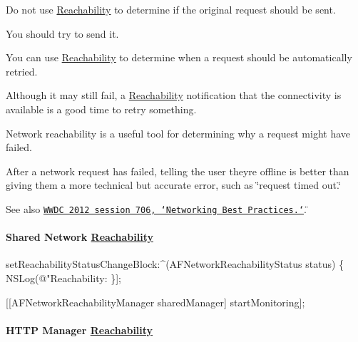 \begin{DoxyItemize}
\item Do not use \mbox{\hyperlink{interface_reachability}{Reachability}} to determine if the original request should be sent.
\begin{DoxyItemize}
\item You should try to send it.
\end{DoxyItemize}
\item You can use \mbox{\hyperlink{interface_reachability}{Reachability}} to determine when a request should be automatically retried.
\begin{DoxyItemize}
\item Although it may still fail, a \mbox{\hyperlink{interface_reachability}{Reachability}} notification that the connectivity is available is a good time to retry something.
\end{DoxyItemize}
\item Network reachability is a useful tool for determining why a request might have failed.
\begin{DoxyItemize}
\item After a network request has failed, telling the user they\textquotesingle{}re offline is better than giving them a more technical but accurate error, such as \char`\"{}request timed out.\char`\"{}
\end{DoxyItemize}
\end{DoxyItemize}

See also \href{https://developer.apple.com/videos/play/wwdc2012-706/}{\tt W\+W\+DC 2012 session 706, \char`\"{}\+Networking Best Practices.\char`\"{}}.

\paragraph*{Shared Network \mbox{\hyperlink{interface_reachability}{Reachability}}}


\begin{DoxyCode}
[[AFNetworkReachabilityManager sharedManager]
       setReachabilityStatusChangeBlock:^(AFNetworkReachabilityStatus status) \{
    NSLog(@"Reachability: %
\}];

[[AFNetworkReachabilityManager sharedManager] startMonitoring];
\end{DoxyCode}


\paragraph*{H\+T\+TP Manager \mbox{\hyperlink{interface_reachability}{Reachability}}}


